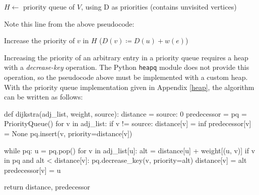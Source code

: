 \documentclass[12pt, titlepage]{article}
\begin{document}
\begin{algorithm}[H]
  \SetAlgoLined
  \DontPrintSemicolon
  $H \longleftarrow$\hspace{0.5mm} priority queue of $V$, using D as priorities\;
  \hspace{13mm}(contains unvisited vertices)\;
  \;
    \caption{Dijkstra's Algorithm (heap with \textit{decrease-key})}
\end{algorithm} \medskip

Note this line from the above pseudocode:
\begin{center}
    Increase the priority of $v$ in $H$\hspace{4mm} ($D(v)\coloneqq D(u) + w(e)$)
\end{center}
Increasing the priority of an arbitrary entry in a priority queue requires a heap with a \textit{decrease-key} operation. The Python \texttt{heapq} module does not provide this operation, so the pseudocode above must be implemented with a custom heap. With the priority queue implementation given in Appendix \ref{heap}, the algorithm can be written as follows: \medskip

\begin{python}
def dijkstra(adj_list, weight, source):
    distance = {source: 0}
    predecessor = {}
    pq = PriorityQueue()
    for v in adj_list:
        if v != source:
            distance[v] = inf
            predecessor[v] = None
        pq.insert(v, priority=distance[v])

    while pq:
        u = pq.pop()
        for v in adj_list[u]:
            alt = distance[u] + weight[(u, v)]
            if v in pq and alt < distance[v]:
                pq.decrease_key(v, priority=alt)
                distance[v] = alt
                predecessor[v] = u

    return distance, predecessor
\end{python}
\end{document}
